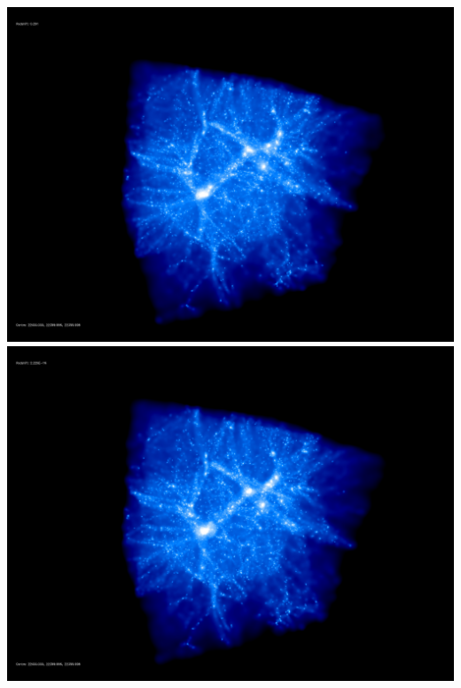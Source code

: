 \includegraphics[scale=0.1]{r256/h100/stages_52/150.jpg} 
\includegraphics[scale=0.1]{r256/h100/stages_52/198.jpg}  \\


